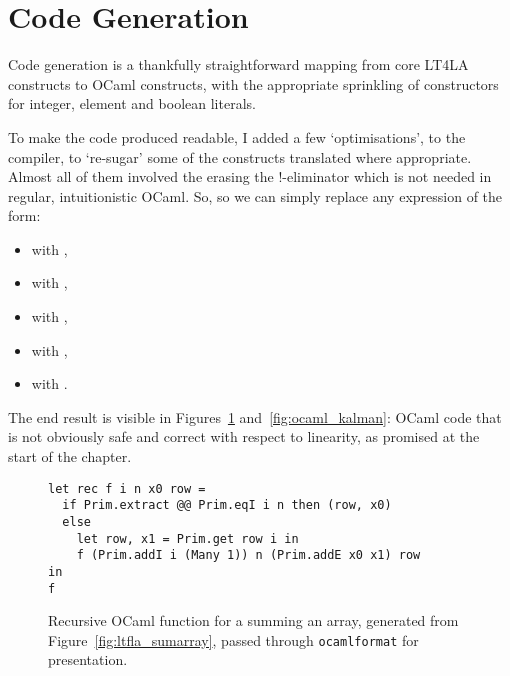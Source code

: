 \section{Code Generation}

Code generation is a thankfully straightforward mapping from core LT4LA
constructs to OCaml constructs, with the appropriate sprinkling of 
constructors for integer, element and boolean literals.

To make the code produced readable, I added a few `optimisations', to the
compiler, to `re-sugar' some of the constructs translated where appropriate.
Almost all of them involved the erasing the !-eliminator which is not needed in
regular, intuitionistic OCaml. So, so we can simply replace any expression of
the form:

\begin{itemize}

    \item {} with
        , 

    \item {} with
        ,

    \item {} with
        ,

    \item {} with ,

    \item {} with
        .

\end{itemize}

The end result is visible in Figures~\ref{fig:ocaml_sumarray}
and~\ref{fig:ocaml_kalman}: OCaml code that is not obviously safe and correct
with respect to linearity, as promised at the start of the chapter.

\begin{figure}[tp]
    \begin{verbatim}
let rec f i n x0 row =
  if Prim.extract @@ Prim.eqI i n then (row, x0)
  else
    let row, x1 = Prim.get row i in
    f (Prim.addI i (Many 1)) n (Prim.addE x0 x1) row
in
f
    \end{verbatim}
    \caption{Recursive OCaml function for a summing an array, generated from
        Figure~\ref{fig:ltfla_sumarray}, passed through \texttt{ocamlformat} for
        presentation.}\label{fig:ocaml_sumarray}

\end{figure}

